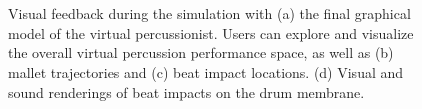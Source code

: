 \begin{figure}[H]
	\begin{center}
		\\
		\\
	\end{center}
	\vspace{-0.5cm}
	\caption[Visual feedback during the simulation]{Visual feedback during the simulation with (a) the final graphical model of the virtual percussionist. Users can explore and visualize the overall virtual percussion performance space, as well as (b) mallet trajectories and (c) beat impact locations. (d) Visual and sound renderings of beat impacts on the drum membrane.}
	\label{fig:visualFeedback}
\end{figure}

